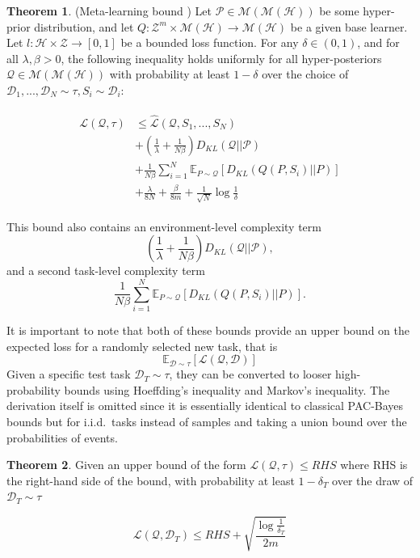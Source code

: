 \documentclass{article}
\theoremstyle{definition}
\newtheorem{theorem}{Theorem}[section]
\newcommand{\Expect}[2]{\mathbb{E}_{#1}\left [#2 \right ]}
\begin{document}
\begin{theorem} (Meta-learning bound \citep{Rothfuss2020}) \label{thm:meta-pb-rothfuss}
	Let $\mathcal{P}\in \mathcal{M}(\mathcal{M}(\mathcal{H}))$ be some hyper-prior distribution, and let $Q: \mathcal{Z}^m\times\mathcal{M}(\mathcal{H})\rightarrow \mathcal{M}(\mathcal{H})$ be a given base learner. Let $l: \mathcal{H}\times \mathcal{Z}\rightarrow [0, 1]$ be a bounded loss function.
	For any $\delta \in (0,1)$, and for all $\lambda, \beta >0$, the following inequality holds uniformly for all hyper-posteriors $\mathcal{Q}\in \mathcal{M}(\mathcal{M}(\mathcal{H}))$ with probability at least $1-\delta$ over the choice of $\mathcal{D}_1,...,\mathcal{D}_N\sim \tau, S_i\sim \mathcal{D}_i$:
	
	\begin{align} \label{eq:meta-pb-rothfuss}
	\begin{split}
	\mathcal{L}(\mathcal{Q}, \tau) &\leq \hat{\mathcal{L}}(\mathcal{Q}, S_1,...,S_N) \\
	&+\left (\frac{1}{\lambda}+\frac{1}{N\beta} \right )D_{KL}(\mathcal{Q}||\mathcal{P}) \\
	&+\frac{1}{N\beta}\sum_{i=1}^{N}\Expect{P\sim \mathcal{Q}}{D_{KL}(Q(P,S_i)||P)} \\
	&+\frac{\lambda}{8N}+\frac{\beta}{8m}+\frac{1}{\sqrt{N}}\log\frac{1}{\delta}
	\end{split}
	\end{align}
	
\end{theorem}

This bound also contains an environment-level complexity term $$\left (\frac{1}{\lambda}+\frac{1}{N\beta} \right )D_{KL}(\mathcal{Q}||\mathcal{P}),$$ and a second task-level complexity term $$\frac{1}{N\beta}\sum_{i=1}^{N}\Expect{P\sim \mathcal{Q}}{D_{KL}(Q(P,S_i)||P)}.$$

It is important to note that both of these bounds provide an upper bound on the expected loss for a randomly selected new task, that is
$$\Expect{\mathcal{D}\sim \tau}{\mathcal{L}(\mathcal{Q}, \mathcal{D})}$$
Given a specific test task $\mathcal{D}_T\sim \tau$, they can be converted to looser high-probability bounds using Hoeffding's inequality and Markov's inequality. The derivation itself is omitted since it is essentially identical to classical PAC-Bayes bounds but for i.i.d.\ tasks instead of samples and taking a union bound over the probabilities of events.

\begin{theorem} \label{thm:meta-highprob}
Given an upper bound of the form $\mathcal{L}(\mathcal{Q}, \tau) \leq RHS$ where RHS is the right-hand side of the bound, with probability at least $1-\delta_T$ over the draw of $\mathcal{D}_T\sim \tau$

$$ \mathcal{L}(\mathcal{Q}, \mathcal{D}_T) \leq RHS + \sqrt{\frac{\log\frac{1}{\delta_T}}{2m}}$$

\end{theorem}
\end{document}
